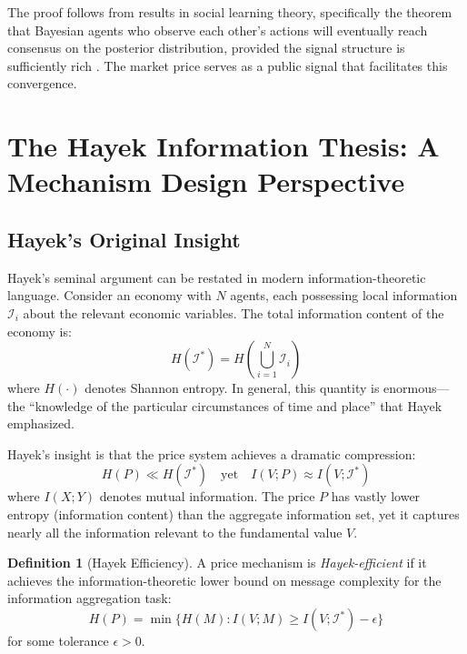 \documentclass[12pt,a4paper]{article}
\theoremstyle{definition}
\newtheorem{definition}[theorem]{Definition}
\newcommand{\I}{\mathcal{I}}
\begin{document}
The proof follows from results in social learning theory, specifically the theorem that Bayesian agents who observe each other's actions will eventually reach consensus on the posterior distribution, provided the signal structure is sufficiently rich \citep{geanakoplos1982}. The market price serves as a public signal that facilitates this convergence.



\section{The Hayek Information Thesis: A Mechanism Design Perspective}\label{sec:hayek_mechanism}

\subsection{Hayek's Original Insight}

Hayek's seminal argument \citep{hayek1945} can be restated in modern information-theoretic language. Consider an economy with $N$ agents, each possessing local information $\I_i$ about the relevant economic variables. The total information content of the economy is:
\begin{equation}
    H(\I^*) = H\left(\bigcup_{i=1}^{N} \I_i\right)
\end{equation}
where $H(\cdot)$ denotes Shannon entropy. In general, this quantity is enormous---the ``knowledge of the particular circumstances of time and place'' that Hayek emphasized.

Hayek's insight is that the price system achieves a dramatic compression:
\begin{equation}\label{eq:hayek_compression}
    H(P) \ll H(\I^*) \quad \text{yet} \quad I(V; P) \approx I(V; \I^*)
\end{equation}
where $I(X;Y)$ denotes mutual information. The price $P$ has vastly lower entropy (information content) than the aggregate information set, yet it captures nearly all the information relevant to the fundamental value $V$.

\begin{definition}[Hayek Efficiency]\label{def:hayek_eff}
A price mechanism is \emph{Hayek-efficient} if it achieves the information-theoretic lower bound on message complexity for the information aggregation task:
\begin{equation}
    H(P) = \min\{H(M) : I(V; M) \geq I(V; \I^*) - \epsilon\}
\end{equation}
for some tolerance $\epsilon > 0$.
\end{definition}
\end{document}
